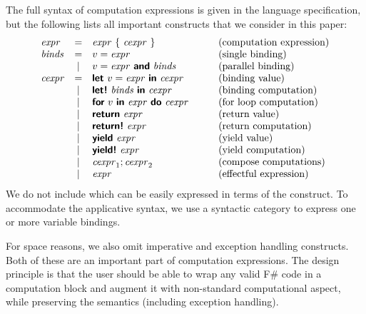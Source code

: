 \documentclass[runningheads,a4paper]{llncs}
\begin{document}
The full syntax of computation expressions is given in the language specification, but the following
lists all important constructs that we consider in this paper:
%
\begin{equation*}
\begin{array}{lclcl}
\expr  &=& \expr ~\{~ \cexpr ~\}                       &\quad&\textnormal{(computation expression)}\\
\binds &=& v=\expr                                          &&\textnormal{(single binding)}\\
       &|& v=\expr ~\kvd{and}~\binds                        &&\textnormal{(parallel binding)}\\
\cexpr &=& \kvd{let}~v=\expr~\kvd{in}~\cexpr                &&\textnormal{(binding value)} \\
       &|& \kvd{let!}~\binds~\kvd{in}~\cexpr                &&\textnormal{(binding computation)} \\
       &|& \kvd{for}~v~\kvd{in}~\expr~\kvd{do}~\cexpr       &&\textnormal{(for loop computation)} \\
       &|& \kvd{return}~\expr                               &&\textnormal{(return value)} \\
       &|& \kvd{return!}~\expr                              &&\textnormal{(return computation)} \\
       &|& \kvd{yield}~\expr                                &&\textnormal{(yield value)} \\
       &|& \kvd{yield!}~\expr                               &&\textnormal{(yield computation)} \\
       &|& \cexpr_1; \cexpr_2                               &&\textnormal{(compose computations)} \\       
       &|& \expr                                            &&\textnormal{(effectful expression)} \\
\end{array}
\end{equation*}
%
We do not include  which can be easily expressed in terms of the  construct. 
To accommodate the applicative syntax, we use a syntactic category \binds\; to express one or more
variable bindings. 

For space reasons, we also omit imperative  and exception handling 
constructs. Both of these are an important part of computation expressions. The design principle is 
that the user should be able to wrap any valid F\# code in a computation block and augment it with 
non-standard computational aspect, while preserving the semantics (including exception handling).
\end{document}
